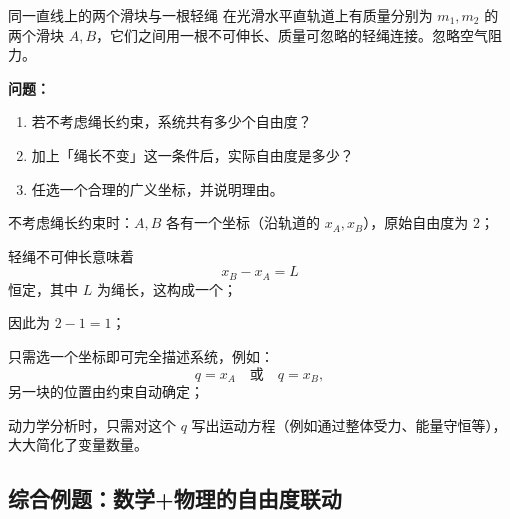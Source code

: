 \documentclass[a4paper,11pt]{ctexart}
\begin{document}
\begin{examplebox}{同一直线上的两个滑块与一根轻绳}
  在光滑水平直轨道上有质量分别为 $m_1,m_2$ 的两个滑块 $A,B$，它们之间用一根不可伸长、质量可忽略的轻绳连接。忽略空气阻力。

  \textbf{问题：}
  \begin{enumerate}
    \item 若不考虑绳长约束，系统共有多少个自由度？
    \item 加上「绳长不变」这一条件后，实际自由度是多少？
    \item 任选一个合理的广义坐标，并说明理由。
  \end{enumerate}

  \begin{focuspoints}
    \item 不考虑绳长约束时：$A,B$ 各有一个坐标（沿轨道的 $x_A,x_B$），原始自由度为 $2$；
    \item 轻绳不可伸长意味着
          \[
            x_B - x_A = L
          \]
          恒定，其中 $L$ 为绳长，这构成一个；
    \item 因此为 $2-1=1$；
    \item 只需选一个坐标即可完全描述系统，例如：
          \[
            q = x_A \quad\text{或}\quad q = x_B,
          \]
          另一块的位置由约束自动确定；
    \item 动力学分析时，只需对这个 $q$ 写出运动方程（例如通过整体受力、能量守恒等），大大简化了变量数量。
  \end{focuspoints}
\end{examplebox}

\subsection{综合例题：数学+物理的自由度联动}
\end{document}
